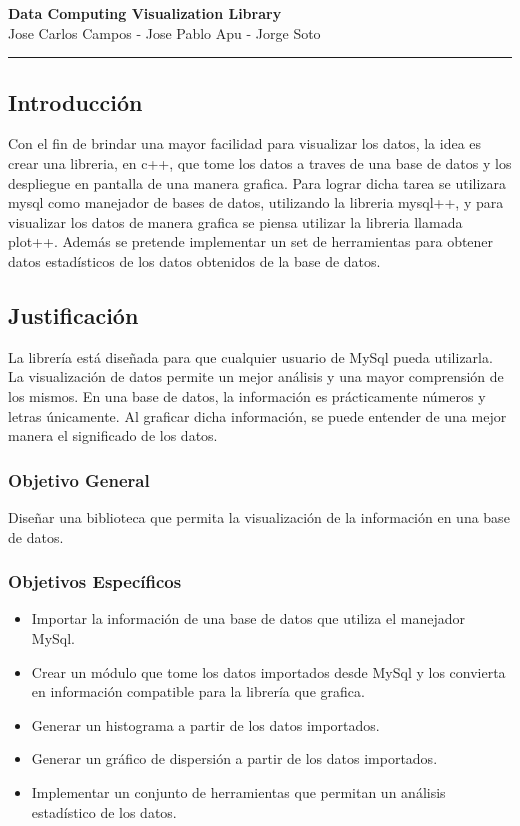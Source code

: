 \documentclass[11pt]{article}
\begin{document}
\begin{center}
{ \huge \bfseries Data Computing Visualization Library }\\[0.2cm]
{ Jose Carlos Campos - Jose Pablo Apu - Jorge Soto }\\[0.2cm]
\rule{\linewidth}{0.25mm}
\end{center}

\subsection*{Introducción}
Con el fin de brindar una mayor facilidad para visualizar los datos, la idea es crear una libreria, en c++, que tome los datos a traves de una base de datos y los despliegue en pantalla de una manera grafica. Para lograr dicha tarea se utilizara mysql como manejador de bases de datos, utilizando la libreria mysql++, y para visualizar los datos de manera grafica se piensa utilizar la libreria llamada plot++. Además se pretende implementar un set de herramientas para obtener datos estadísticos de los datos obtenidos de la base de datos. 

\subsection*{Justificación}
La librería está diseñada para que cualquier usuario de MySql pueda utilizarla. La visualización de datos permite un mejor análisis y una mayor comprensión de los mismos. En una base de datos, la información es prácticamente números y letras únicamente. Al graficar dicha información, se puede entender de una mejor manera el significado de los datos.

\subsubsection*{Objetivo General}
Diseñar una biblioteca que permita la visualización de la información en una base de datos.

\subsubsection*{Objetivos Específicos}
\begin{itemize}
\item Importar la información de una base de datos que utiliza el manejador MySql.
\item Crear un módulo que tome los datos importados desde MySql y los convierta en información compatible para la librería que grafica.
\item Generar un histograma a partir de los datos importados.
\item Generar un gráfico de dispersión a partir de los datos importados.
\item Implementar un conjunto de herramientas que permitan un análisis estadístico de los datos.
\end{itemize}
\end{document}
